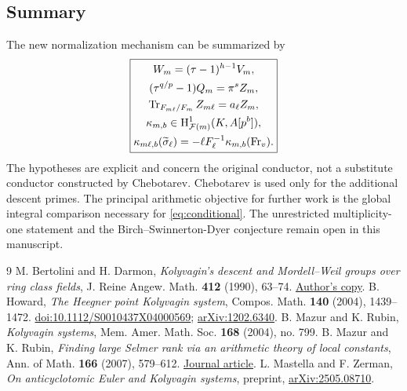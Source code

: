 \documentclass[11pt]{article}
\theoremstyle{definition}\newtheorem{definition}[theorem]{Definition}
\theoremstyle{remark}\newtheorem{remark}[theorem]{Remark}
\newcommand{\Frob}{\operatorname{Fr}}\newcommand{\HH}{\mathrm H}
\begin{document}
\subsection{Summary}
The new normalization mechanism can be summarized by
\[
 \boxed{\begin{gathered}
 W_m=(\tau-1)^{h-1}V_m,\\
 (\tau^{q/p}-1)Q_m=\pi^s Z_m,\\
 \Tr_{F_{m\ell}/F_m}Z_{m\ell}=a_\ell Z_m,\\
 \kappa_{m,b}\in\HH^1_{\mathcal F(m)}(K,A[p^b]),\\
 \kappa_{m\ell,b}(\widetilde\sigma_\ell)=-\ell F_\ell^{-1}\kappa_{m,b}(\Frob_v).
 \end{gathered}}
\]
The hypotheses are explicit and concern the original conductor, not a substitute conductor constructed by Chebotarev. Chebotarev is used only for the additional descent primes. The principal arithmetic objective for further work is the global integral comparison necessary for \eqref{eq:conditional}. The unrestricted multiplicity-one statement and the Birch--Swinnerton-Dyer conjecture remain open in this manuscript.

\begin{thebibliography}{9}
 M. Bertolini and H. Darmon, \emph{Kolyvagin's descent and Mordell--Weil groups over ring class fields}, J. Reine Angew. Math. \textbf{412} (1990), 63--74. \href{https://www.math.mcgill.ca/darmon/pub/Articles/Research/04.Kolyvagin-descent/paper.pdf}{Author's copy}.
 B. Howard, \emph{The Heegner point Kolyvagin system}, Compos. Math. \textbf{140} (2004), 1439--1472. \href{https://doi.org/10.1112/S0010437X04000569}{doi:10.1112/S0010437X04000569}; \href{https://arxiv.org/abs/1202.6340}{arXiv:1202.6340}.
 B. Mazur and K. Rubin, \emph{Kolyvagin systems}, Mem. Amer. Math. Soc. \textbf{168} (2004), no. 799.
 B. Mazur and K. Rubin, \emph{Finding large Selmer rank via an arithmetic theory of local constants}, Ann. of Math. \textbf{166} (2007), 579--612. \href{https://annals.math.princeton.edu/2007/166-2/p08}{Journal article}.
 L. Mastella and F. Zerman, \emph{On anticyclotomic Euler and Kolyvagin systems}, preprint, \href{https://arxiv.org/abs/2505.08710}{arXiv:2505.08710}.
\end{thebibliography}
\end{document}
